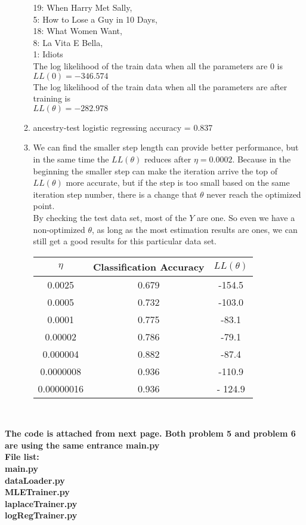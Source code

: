 \documentclass{article}
\begin{document}
\begin{enumerate}
\begin{enumerate}
		19:  When Harry Met Sally,\\
		5: How to Lose a Guy in 10 Days, \\
		18: What Women Want, \\
		8: La Vita E Bella, \\
		1: Idiots\\
		The log likelihood of the train data when all the parameters are 0 is\\
		$LL(0) = -346.574$\\
		The log likelihood of the train data when all the parameters are after training is\\
		$LL(\theta) = -282.978$\\
		\item 
		ancestry-test logistic regressing accuracy = 0.837\\
		\item
		We can find the smaller step length can provide better performance, but in the same time the $LL(\theta)$ reduces after $\eta = 0.0002$. Because in the beginning the smaller step can make the iteration arrive the top of $LL(\theta)$ more accurate, but if the step is too small based on the same iteration step number, there is a change that $\theta$ never reach the optimized point.\\
		By checking the test data set, most of the $Y$ are one. So even we have a non-optimized $\theta$, as long as the most estimation results are ones, we can still get a good results for this particular data set.\\
		\begin{tabular}{|c|c|c|}
			\hline
			$\eta$ & Classification Accuracy& $LL(\theta)$\\
			\hline
			0.0025 & 0.679 & -154.5\\
			0.0005 & 0.732 & -103.0\\
			0.0001 & 0.775 & -83.1\\
			0.00002 & 0.786 & -79.1\\
			0.000004 & 0.882 & -87.4\\
			0.0000008 & 0.936 & -110.9\\
			0.00000016 & 0.936 & - 124.9\\

			\hline
		\end{tabular}\\
	
		 
	\end{enumerate}
	
	
	
\end{enumerate}

\textbf{The code is attached from next page. Both problem 5 and problem 6 are using the same entrance main.py\\File list:\\}
\textbf{main.py\\dataLoader.py\\MLETrainer.py\\laplaceTrainer.py\\logRegTrainer.py\\}
\end{document}
